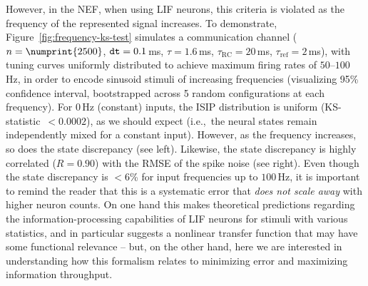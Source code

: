 However, in the NEF, when using LIF neurons, this criteria is violated as the frequency of the represented signal increases.
To demonstrate, Figure~\ref{fig:frequency-ks-test} simulates a communication channel ($n = \numprint{2500}$, $\texttt{dt}{} = 0.1$\,ms, $\tau = 1.6$\,ms, $\tau_\text{RC} = 20$\,ms, $\tau_\text{ref} = 2$\,ms), with tuning curves uniformly distributed to achieve maximum firing rates of $50$--$100$\,Hz, in order to encode sinusoid stimuli of increasing frequencies (visualizing 95\% confidence interval, bootstrapped across 5 random configurations at each frequency).
For $0$\,Hz (constant) inputs, the ISIP distribution is uniform (KS-statistic~$<0.0002$), as we should expect (i.e.,~the neural states remain independently mixed for a constant input).
However, as the frequency increases, so does the state discrepancy (see left).
Likewise, the state discrepancy is highly correlated ($R = 0.90$) with the RMSE of the spike noise (see right).
Even though the state discrepancy is $< 6$\% for input frequencies up to $100$\,Hz, it is important to remind the reader that this is a systematic error that \emph{does not scale away} with higher neuron counts.
On one hand this makes theoretical predictions regarding the information-processing capabilities of LIF neurons for stimuli with various statistics, and in particular suggests a nonlinear transfer function that may have some functional relevance -- but, on the other hand, here we are interested in understanding how this formalism relates to minimizing error and maximizing information throughput.

